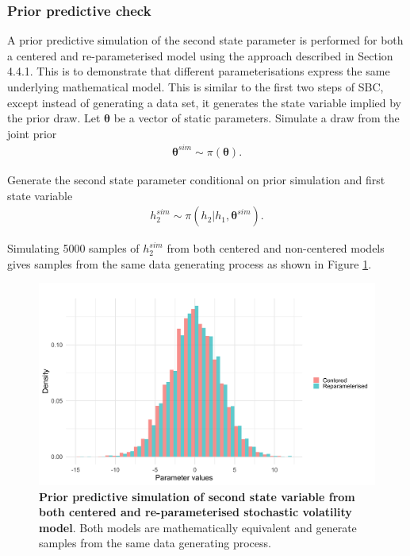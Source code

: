 \documentclass[12pt, a4paper]{article}
\begin{document}
    \subsubsection{Prior predictive check}
        A prior predictive simulation of the second state parameter is performed for both a centered and re-parameterised model using the approach described in Section 4.4.1. This is to demonstrate that different parameterisations express the same underlying mathematical model. This is similar to the first two steps of SBC, except instead of generating a data set, it generates the state variable implied by the prior draw. Let $\boldsymbol{\theta}$ be a vector of static parameters. Simulate a draw from the joint prior
        \begin{align}
        \boldsymbol{\theta}^{sim} \sim \pi(\boldsymbol{\theta}).
        \end{align}

        Generate the second state parameter conditional on prior simulation and first state variable
        \begin{align}
        h_2^{sim} \sim \pi (h_2|h_1, \boldsymbol{\theta}^{sim}).
        \end{align}

        Simulating 5000 samples of $h_2^{sim}$ from both centered and non-centered models gives samples from the same data generating process as shown in Figure \ref{fig:priorpred}. 


        \begin{figure}[h]
            \centering
            \includegraphics[scale=0.1]{figures/ppc_h2.png}
            \caption{\textbf{Prior predictive simulation of second state variable from both centered and re-parameterised stochastic volatility model}. Both models are mathematically equivalent and generate samples from the same data generating process.}
            \label{fig:priorpred}
        \end{figure}
        
\end{document}
